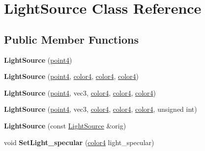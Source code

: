 \hypertarget{class_light_source}{\section{\-Light\-Source \-Class \-Reference}
\label{class_light_source}
}
\subsection*{\-Public \-Member \-Functions}
\begin{DoxyCompactItemize}
\item 
\hypertarget{class_light_source_a2b0f0cb0273a0028dbaa22857aaa3afb}{{\bfseries \-Light\-Source} (\hyperlink{struct_angel_1_1vec4}{point4})}\label{class_light_source_a2b0f0cb0273a0028dbaa22857aaa3afb}

\item 
\hypertarget{class_light_source_a9505e45e4d66ef7fcbe2c27e21891dde}{{\bfseries \-Light\-Source} (\hyperlink{struct_angel_1_1vec4}{point4}, \hyperlink{struct_angel_1_1vec4}{color4}, \hyperlink{struct_angel_1_1vec4}{color4}, \hyperlink{struct_angel_1_1vec4}{color4})}\label{class_light_source_a9505e45e4d66ef7fcbe2c27e21891dde}

\item 
\hypertarget{class_light_source_a3ba9ff99146ad0df1fc3ad501a95b1d0}{{\bfseries \-Light\-Source} (\hyperlink{struct_angel_1_1vec4}{point4}, vec3, \hyperlink{struct_angel_1_1vec4}{color4}, \hyperlink{struct_angel_1_1vec4}{color4}, \hyperlink{struct_angel_1_1vec4}{color4})}\label{class_light_source_a3ba9ff99146ad0df1fc3ad501a95b1d0}

\item 
\hypertarget{class_light_source_a422ea5fe583168e4ec742d71645863f2}{{\bfseries \-Light\-Source} (\hyperlink{struct_angel_1_1vec4}{point4}, vec3, \hyperlink{struct_angel_1_1vec4}{color4}, \hyperlink{struct_angel_1_1vec4}{color4}, \hyperlink{struct_angel_1_1vec4}{color4}, unsigned int)}\label{class_light_source_a422ea5fe583168e4ec742d71645863f2}

\item 
\hypertarget{class_light_source_a71dbbd92599046fb93fb1e7740088947}{{\bfseries \-Light\-Source} (const \hyperlink{class_light_source}{\-Light\-Source} \&orig)}\label{class_light_source_a71dbbd92599046fb93fb1e7740088947}

\item 
\hypertarget{class_light_source_a5f842c88b699493bcdb3d7e6ea379569}{void {\bfseries \-Set\-Light\-\_\-specular} (\hyperlink{struct_angel_1_1vec4}{color4} light\-\_\-specular)}\label{class_light_source_a5f842c88b699493bcdb3d7e6ea379569}


\end{DoxyCompactItemize}
